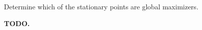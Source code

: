 Determine which of the stationary points are global maximizers.

\begin{solution}
    \bf{TODO.}
    \ \\
    \vfill
\end{solution}